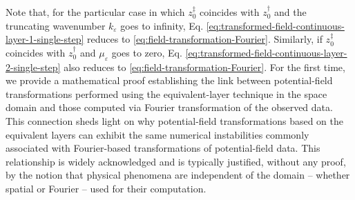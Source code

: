 Note that, for the particular case in which $z^{\ddagger}_{0}$ coincides with $z^{\dagger}_{0}$ and 
the truncating wavenumber $k_{\varepsilon}$ goes to infinity, Eq. 
\ref{eq:transformed-field-continuous-layer-1-single-step} reduces to \ref{eq:field-transformation-Fourier}.
Similarly, if $z^{\ddagger}_{0}$ coincides with $z^{\dagger}_{0}$ and $\mu_{\varepsilon}$ goes to zero,
Eq. \ref{eq:transformed-field-continuous-layer-2-single-step} also reduces to \ref{eq:field-transformation-Fourier}.
For the first time, we provide a mathematical proof establishing the link between
potential-field transformations performed using the equivalent-layer technique in 
the space domain and those computed via Fourier transformation of the observed data.
This connection sheds light on why potential-field transformations based on the
equivalent layers can exhibit the same numerical instabilities commonly associated
with Fourier-based transformations of potential-field data. This
relationship is widely acknowledged and is typically justified, without any proof, by  
the notion that physical phenomena are independent of the domain 
-- whether spatial or Fourier -- used for their computation.